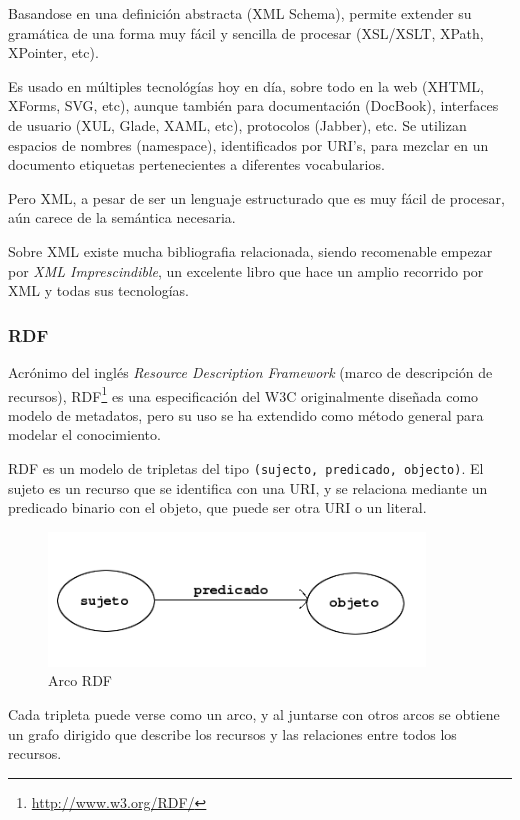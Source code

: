 Basandose en una definición abstracta (XML Schema), permite extender su gramática 
de una forma muy fácil y sencilla de procesar (XSL/XSLT, XPath, XPointer, etc).

Es usado en múltiples tecnológías hoy en día, sobre todo en la web (XHTML, XForms, 
SVG, etc), aunque también para documentación (DocBook), interfaces de usuario (XUL,
Glade, XAML, etc), protocolos (Jabber), etc. Se utilizan espacios de nombres (namespace), 
identificados por URI's, para mezclar en un documento etiquetas pertenecientes a 
diferentes vocabularios.

Pero XML, a pesar de ser un lenguaje estructurado que es muy fácil de procesar, 
aún carece de la semántica necesaria. 

Sobre XML existe mucha bibliografia relacionada, siendo recomenable empezar por
\emph{XML Imprescindible}\cite{XMLNutshell}, un excelente libro que hace un amplio
recorrido por XML y todas sus tecnologías.

\subsubsection{RDF}

Acrónimo del inglés \emph{Resource Description Framework} (marco de descripción 
de recursos), RDF\footnote{\url{http://www.w3.org/RDF/}} es una especificación del 
W3C originalmente diseñada como modelo de metadatos, pero su uso se ha extendido como
método general para modelar el conocimiento.

RDF es un modelo de tripletas del tipo \texttt{(sujecto, predicado, objecto)}. El
sujeto es un recurso que se identifica con una URI, y se relaciona mediante un 
predicado binario con el objeto, que puede ser otra URI o un literal.

\begin{figure}[H]
	\centering
	\includegraphics[width=10cm]{images/arc.png}
	\caption{Arco RDF}
	\label{fig:rdfTriplet}
\end{figure}

Cada tripleta puede verse como un arco, y al juntarse con otros arcos se obtiene
un grafo dirigido que describe los recursos y las relaciones entre todos los 
recursos.


